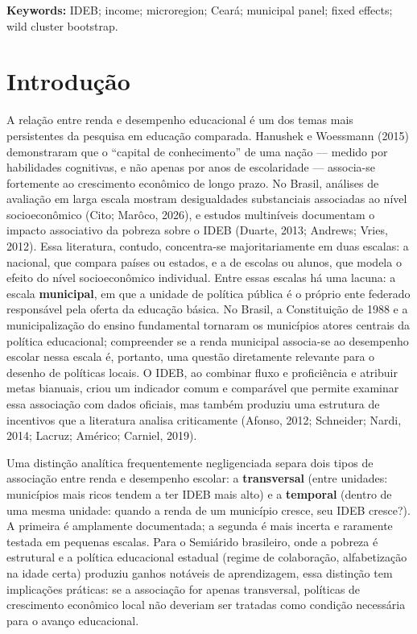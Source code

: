 \documentclass[12pt,a4paper]{article}
\begin{document}
\noindent\textbf{Keywords:} IDEB; income; microregion; Ceará; municipal panel; fixed effects; wild cluster bootstrap.

\section{Introdução}

A relação entre renda e desempenho educacional é um dos temas mais persistentes da pesquisa em educação comparada. Hanushek e Woessmann (2015) demonstraram que o ``capital de conhecimento'' de uma nação --- medido por habilidades cognitivas, e não apenas por anos de escolaridade --- associa-se fortemente ao crescimento econômico de longo prazo. No Brasil, análises de avaliação em larga escala mostram desigualdades substanciais associadas ao nível socioeconômico (Cito; Marôco, 2026), e estudos multiníveis documentam o impacto associativo da pobreza sobre o IDEB (Duarte, 2013; Andrews; Vries, 2012).
Essa literatura, contudo, concentra-se majoritariamente em duas escalas: a nacional, que compara países ou estados, e a de escolas ou alunos, que modela o efeito do nível socioeconômico individual. Entre essas escalas há uma lacuna: a escala \textbf{municipal}, em que a unidade de política pública é o próprio ente federado responsável pela oferta da educação básica. No Brasil, a Constituição de 1988 e a municipalização do ensino fundamental tornaram os municípios atores centrais da política educacional; compreender se a renda municipal associa-se ao desempenho escolar nessa escala é, portanto, uma questão diretamente relevante para o desenho de políticas locais. O IDEB, ao combinar fluxo e proficiência e atribuir metas bianuais, criou um indicador comum e comparável que permite examinar essa associação com dados oficiais, mas também produziu uma estrutura de incentivos que a literatura analisa criticamente (Afonso, 2012; Schneider; Nardi, 2014; Lacruz; Américo; Carniel, 2019).


Uma distinção analítica frequentemente negligenciada separa dois tipos de associação entre renda e desempenho escolar: a \textbf{transversal} (entre unidades: municípios mais ricos tendem a ter IDEB mais alto) e a \textbf{temporal} (dentro de uma mesma unidade: quando a renda de um município cresce, seu IDEB cresce?). A primeira é amplamente documentada; a segunda é mais incerta e raramente testada em pequenas escalas. Para o Semiárido brasileiro, onde a pobreza é estrutural e a política educacional estadual (regime de colaboração, alfabetização na idade certa) produziu ganhos notáveis de aprendizagem, essa distinção tem implicações práticas: se a associação for apenas transversal, políticas de crescimento econômico local não deveriam ser tratadas como condição necessária para o avanço educacional.
\end{document}
